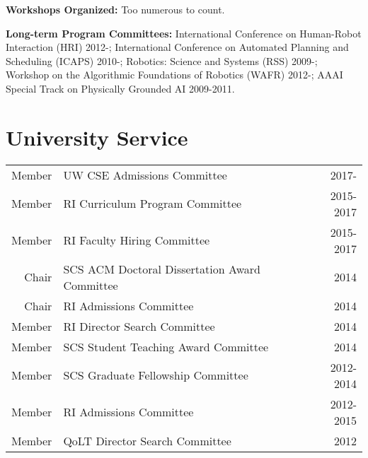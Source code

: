 
\vspace{1em}
\noindent \textbf{Workshops Organized:} Too numerous to count. 


\vspace{1em}
\noindent \textbf{Long-term Program Committees:} 
International Conference on Human-Robot Interaction (HRI) 2012-;
International Conference on Automated Planning and Scheduling (ICAPS) 2010-;
Robotics: Science and Systems (RSS) 2009-; 
Workshop on the Algorithmic Foundations of Robotics (WAFR) 2012-;
AAAI Special Track on Physically Grounded AI 2009-2011.

\section{University Service}
\begin{tabularx}{\linewidth}{rXr}
Member & UW CSE Admissions Committee & 2017- \\
Member & RI Curriculum Program Committee & 2015-2017\\
Member & RI Faculty Hiring Committee & 2015-2017\\
Chair & SCS ACM Doctoral Dissertation Award Committee & 2014\\
Chair & RI Admissions Committee & 2014 \\
Member & RI Director Search Committee & 2014 \\
Member & SCS Student Teaching Award Committee & 2014 \\
Member & SCS Graduate Fellowship Committee & 2012-2014 \\
Member & RI Admissions Committee & 2012-2015 \\
Member & QoLT Director Search Committee & 2012\\
\end{tabularx}
